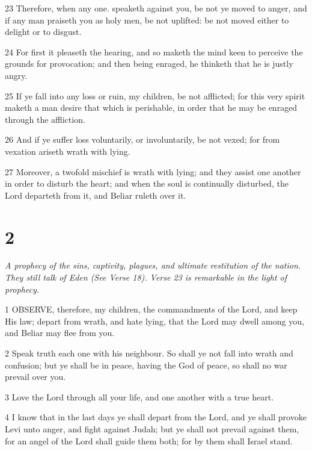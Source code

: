 \par 23 Therefore, when any one. speaketh against you, be not ye moved to anger, and if any man praiseth you as holy men, be not uplifted: be not moved either to delight or to disgust.

\par 24 For first it pleaseth the hearing, and so maketh the mind keen to perceive the grounds for provocation; and then being enraged, he thinketh that he is justly angry.

\par 25 If ye fall into any loss or ruin, my children, be not afflicted; for this very spirit maketh a man desire that which is perishable, in order that he may be enraged through the affliction.

\par 26 And if ye suffer loss voluntarily, or involuntarily, be not vexed; for from vexation ariseth wrath with lying.

\par 27 Moreover, a twofold mischief is wrath with lying; and they assist one another in order to disturb the heart; and when the soul is continually disturbed, the Lord departeth from it, and Beliar ruleth over it.



\chapter{2}

\par \textit{A prophecy of the sins, captivity, plagues, and ultimate restitution of the nation. They still talk of Eden (See Verse 18). Verse 23 is remarkable in the light of prophecy.}

\par 1 OBSERVE, therefore, my children, the commandments of the Lord, and keep His law; depart from wrath, and hate lying, that the Lord may dwell among you, and Beliar may flee from you.

\par 2 Speak truth each one with his neighbour. So shall ye not fall into wrath and confusion; but ye shall be in peace, having the God of peace, so shall no war prevail over you.

\par 3 Love the Lord through all your life, and one another with a true heart.

\par 4 I know that in the last days ye shall depart from the Lord, and ye shall provoke Levi unto anger, and fight against Judah; but ye shall not prevail against them, for an angel of the Lord shall guide them both; for by them shall Israel stand.

